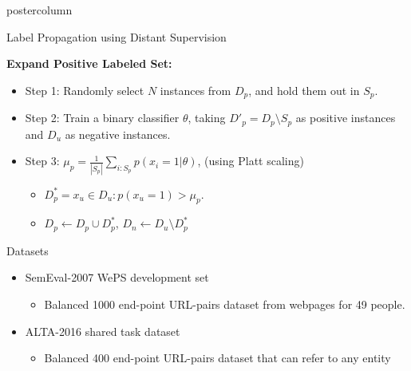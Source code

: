 \documentclass{beamer}
\begin{document}
\begin{frame}
\begin{columns}
\begin{column}{.5\textwidth}
\begin{beamercolorbox}[center]{postercolumn}
\begin{minipage}{.98\textwidth}
{\begin{block}{Label Propagation using Distant Supervision}
\item \textbf{Expand Positive Labeled Set:}
\begin{itemize}
\item Step 1: Randomly select $N$ instances from $D_{p}$, and hold them out in $S_{p}$.
	\vspace{0.5em}
\item Step 2: Train a binary classifier $\theta$, taking $D'_{p} = D_p \setminus S_p$ as positive instances and $D_{u}$ as negative instances. 
	\vspace{0.5em}
\item Step 3: \mbox{$\mu_{p} = \frac{1}{|S_{p}|}\sum_{i:S_{p}} p(x_{i}=1 | \theta)$,} (using Platt scaling)
	\vspace{0.5em}
\begin{itemize}
\item $D_p^* = {x_u \in D_u: p(x_{u}=1) > \mu_{p}}$.
	\vspace{0.5em}
\item $D_{p} \leftarrow D_{p} \cup D_{p}^*$, $D_{n} \leftarrow D_{u} \setminus D_{p}^*$
\vfill
\end{itemize}
              \end{itemize}
\vspace{0.5em}
            \end{block}
            \vfill
					
	\begin{myblock}{Datasets}
        \begin{itemize}
        \item SemEval-2007 WePS development set 
	\begin{itemize}
		\item Balanced 1000 end-point URL-pairs dataset from webpages for 49 people. 
	\end{itemize}	
	\vspace{0.5em}
	\item ALTA-2016 shared task dataset
	 	\begin{itemize}
		\item Balanced 400 end-point URL-pairs dataset that can refer to any entity 
	      \end{itemize}
          \end{itemize}
        \end{myblock} \vfill

}
\end{minipage}
\end{beamercolorbox}
\end{column}
\end{columns}
\end{frame}
\end{document}
